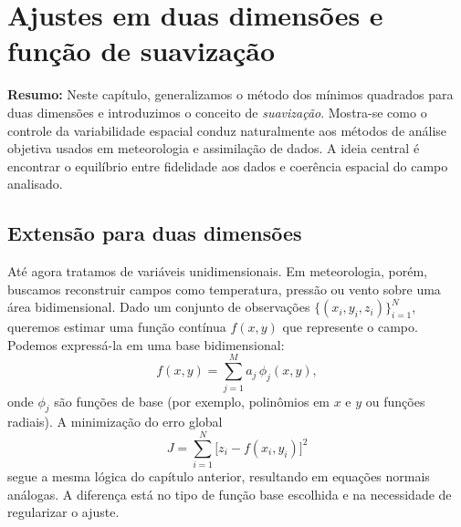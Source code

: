 \chapter{Ajustes em duas dimensões e função de suavização}
\label{ch:ajustes2d}

\noindent\textbf{Resumo:}
Neste capítulo, generalizamos o método dos mínimos quadrados para duas dimensões e introduzimos o conceito de \emph{suavização}.  
Mostra-se como o controle da variabilidade espacial conduz naturalmente aos métodos de análise objetiva usados em meteorologia e assimilação de dados.  
A ideia central é encontrar o equilíbrio entre fidelidade aos dados e coerência espacial do campo analisado.

\section{Extensão para duas dimensões}
Até agora tratamos de variáveis unidimensionais.  
Em meteorologia, porém, buscamos reconstruir campos como temperatura, pressão ou vento sobre uma área bidimensional.  
Dado um conjunto de observações $\{(x_i, y_i, z_i)\}_{i=1}^{N}$, queremos estimar uma função contínua $f(x,y)$ que represente o campo.  
Podemos expressá-la em uma base bidimensional:
\begin{equation}
f(x,y) = \sum_{j=1}^{M} a_j \, \phi_j(x,y),
\label{eq:basis2d}
\end{equation}
onde $\phi_j$ são funções de base (por exemplo, polinômios em $x$ e $y$ ou funções radiais).  
A minimização do erro global
\begin{equation}
J = \sum_{i=1}^{N} \big[z_i - f(x_i,y_i)\big]^2
\label{eq:2d-cost}
\end{equation}
segue a mesma lógica do capítulo anterior, resultando em equações normais análogas.  
A diferença está no tipo de função base escolhida e na necessidade de regularizar o ajuste.

